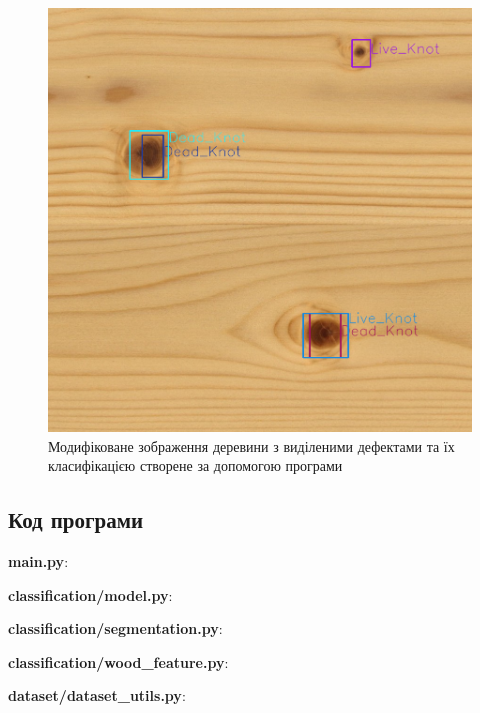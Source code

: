 \documentclass[oneside,14pt]{extarticle}
\begin{document}
\begin{figure}[H]
	\centering
	\includegraphics[scale=0.5]{2}
	\caption{Модифіковане зображення деревини з виділеними дефектами та їх класифікацією створене за допомогою програми}
\end{figure}

\subsection{Код програми}

\textbf{main.py}:
{\small}

\textbf{classification/model.py}:
{\small}

\textbf{classification/segmentation.py}:
{\small}

\textbf{classification/wood\_feature.py}:
{\small}

\textbf{dataset/dataset\_utils.py}:
{\small}
\end{document}
